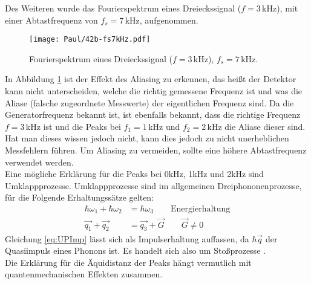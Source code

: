 \newpage
Des Weiteren wurde das Fourierspektrum eines Dreieckssignal ($f = 3$\,kHz), mit einer Abtastfrequenz von $f_s = 7$\,kHz, aufgenommen.
\begin{figure}[h]
    \centering
    \texttt{[image: Paul/42b-fs7kHz.pdf]}
    \caption{Fourierspektrum eines Dreieckssignal ($f = 3$\,kHz), $f_s = 7$\,kHz.}
    \label{fig:42a3}
\end{figure}

In Abbildung \ref{fig:42a3} ist der Effekt des Aliasing zu erkennen, das heißt der Detektor kann nicht unterscheiden, welche die richtig gemessene Frequenz ist und was die Aliase (falsche zugeordnete Messwerte) der eigentlichen Frequenz sind. Da die Generatorfrequenz bekannt ist, ist ebenfalls bekannt, dass die richtige Frequenz $f=3$\,kHz ist und die Peaks bei $f_1=1$\,kHz und $f_2=2$\,kHz die Aliase dieser sind. Hat man dieses wissen jedoch nicht, kann dies jedoch zu nicht unerheblichen Messfehlern führen. Um Aliasing zu vermeiden, sollte eine höhere Abtastfrequenz verwendet werden.\\

Eine mögliche Erklärung für die Peaks bei 0kHz, 1kHz und 2kHz sind Umklappprozesse.
Umklappprozesse sind im allgemeinen Dreiphononenprozesse, für die Folgende Erhaltungssätze gelten:
\begin{align}
    \hbar \omega_1 +\hbar \omega_2 &= \hbar \omega_3  \qquad \text{Energierhaltung}\\
    \vec{q_1} + \vec{q_2} &= \vec{q_3} + \vec{G} \qquad \vec{G} \neq 0 \label{eq:UPImp}
\end{align}
Gleichung \ref{eq:UPImp} lässt sich als Impulserhaltung auffassen, da \( \hbar \vec{q}\) der Quasiimpuls eines Phonons ist. Es handelt sich also um Stoßprozesse \citep{EFP}.\\
Die Erklärung für die Äquidistanz der Peaks hängt vermutlich mit quantenmechanischen Effekten zusammen.